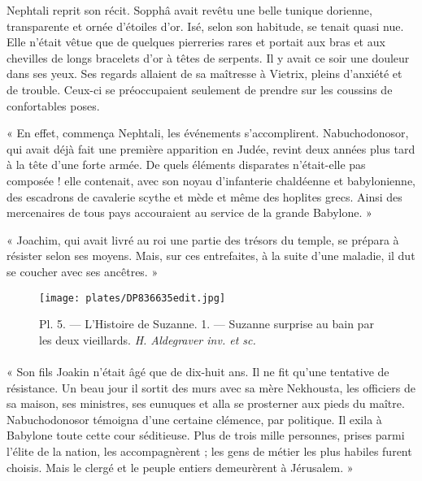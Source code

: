 \documentclass[a4paper, 11pt, oneside, polutonikogreek, french]{article}
\begin{document}
\bigskip
\centerline{\EightStarTaper}
\centerline{\EightStarTaper\EightStarTaper}
\bigskip

Nephtali reprit son récit. Sopphâ avait revêtu une belle tunique dorienne, transparente et ornée d'étoiles d'or. Isé, selon son habitude, se tenait quasi nue. Elle n'était vêtue que de quelques pierreries rares et portait aux bras et aux chevilles de longs bracelets d'or à têtes de serpents. Il y avait ce soir une douleur dans ses yeux. Ses regards allaient de sa maîtresse à Vietrix, pleins d'anxiété et de trouble. Ceux-ci se préoccupaient seulement de prendre sur les coussins de confortables poses.

\bigskip
\centerline{\EightStarTaper}
\centerline{\EightStarTaper\EightStarTaper}
\bigskip

« En effet, commença Nephtali, les événements s'accomplirent. Nabuchodonosor, qui avait déjà fait une première apparition en Judée, revint deux années plus tard à la tête d'une forte armée. De quels éléments disparates n'était-elle pas composée ! elle contenait, avec son noyau d'infanterie chaldéenne et babylonienne, des escadrons de cavalerie scythe et mède et même des hoplites grecs. Ainsi des mercenaires de tous pays accouraient au service de la grande Babylone. »

« Joachim, qui avait livré au roi une partie des trésors du temple, se prépara à résister selon ses moyens. Mais, sur ces entrefaites, à la suite d'une maladie, il dut se coucher avec ses ancêtres. »
\clearpage
\vspace*{\fill}
\begin{figure}[H]
\centering
\texttt{[image: plates/DP836635edit.jpg]}
\caption{\Fontauri Pl. 5. --- L'Histoire de Suzanne. 1. --- Suzanne surprise au bain par les deux vieillards. \emph{H. Aldegraver inv. et sc.}}
\end{figure}
\vspace*{\fill}
\clearpage
\paragraph{}
« Son fils Joakin n'était âgé que de dix-huit ans. Il ne fit qu'une tentative de résistance. Un beau jour il sortit des murs avec sa mère Nekhousta, les officiers de sa maison, ses ministres, ses eunuques et alla se prosterner aux pieds du maître. Nabuchodonosor témoigna d'une certaine clémence, par politique. Il exila à Babylone toute cette cour séditieuse. Plus de trois mille personnes, prises parmi l'élite de la nation, les accompagnèrent ; les gens de métier les plus habiles furent choisis. Mais le clergé et le peuple entiers demeurèrent à Jérusalem. »
\end{document}
